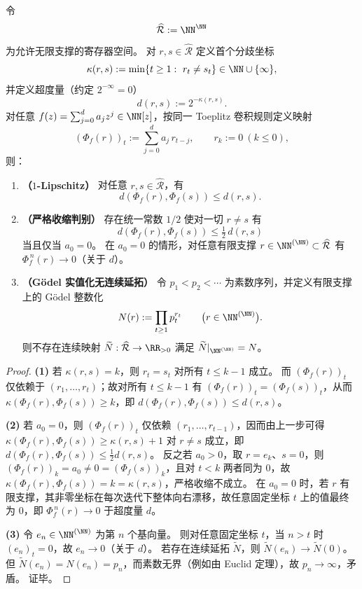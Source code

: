 \begin{theorem}\label{thm:conclusion-register-ultrametric-lipschitz-and-godel-no-real-extension}
令
\[
\widehat{\mathcal R}:=\NN^{\NN}
\]
为允许无限支撑的寄存器空间。
对 \(r,s\in\widehat{\mathcal R}\) 定义首个分歧坐标
\[
\kappa(r,s):=\min\{t\ge 1:\ r_t\neq s_t\}\in\NN\cup\{\infty\},
\]
并定义超度量（约定 \(2^{-\infty}=0\)）
\[
d(r,s):=2^{-\kappa(r,s)}.
\]
对任意 \(f(z)=\sum_{j=0}^{d}a_j z^j\in\NN[z]\)，按同一 Toeplitz 卷积规则定义映射
\[
(\Phi_f(r))_t:=\sum_{j=0}^{d}a_j\,r_{t-j},
\qquad r_k:=0\ (k\le 0),
\]
则：
\begin{enumerate}
  \item \textbf{（\(1\)-Lipschitz）}
        对任意 \(r,s\in\widehat{\mathcal R}\)，有
        \[
        d(\Phi_f(r),\Phi_f(s))\le d(r,s).
        \]
  \item \textbf{（严格收缩判别）}
        存在统一常数 \(1/2\) 使对一切 \(r\neq s\) 有
        \[
        d(\Phi_f(r),\Phi_f(s))\le \tfrac12\,d(r,s)
        \]
        当且仅当 \(a_0=0\)。
        在 \(a_0=0\) 的情形，对任意有限支撑 \(r\in\NN^{(\NN)}\subset\widehat{\mathcal R}\) 有 \(\Phi_f^{\,n}(r)\to 0\)（关于 \(d\)）。
  \item \textbf{（Gödel 实值化无连续延拓）}
        令 \(p_1<p_2<\cdots\) 为素数序列，并定义有限支撑上的 Gödel 整数化
        \[
        N(r):=\prod_{t\ge 1}p_t^{r_t}\qquad\bigl(r\in\NN^{(\NN)}\bigr).
        \]
        则不存在连续映射 \(\widetilde N:\widehat{\mathcal R}\to\RR_{>0}\) 满足 \(\widetilde N|_{\NN^{(\NN)}}=N\)。
\end{enumerate}
\end{theorem}
\begin{proof}
\textbf{(1)} 若 \(\kappa(r,s)=k\)，则 \(r_t=s_t\) 对所有 \(t\le k-1\) 成立。
而 \((\Phi_f(r))_t\) 仅依赖于 \((r_1,\dots,r_t)\)；故对所有 \(t\le k-1\) 有 \((\Phi_f(r))_t=(\Phi_f(s))_t\)，从而 \(\kappa(\Phi_f(r),\Phi_f(s))\ge k\)，即 \(d(\Phi_f(r),\Phi_f(s))\le d(r,s)\)。
\par
\textbf{(2)} 若 \(a_0=0\)，则 \((\Phi_f(r))_t\) 仅依赖 \((r_1,\dots,r_{t-1})\)，因而由上一步可得
\(\kappa(\Phi_f(r),\Phi_f(s))\ge \kappa(r,s)+1\)
对 \(r\neq s\) 成立，即
\(
d(\Phi_f(r),\Phi_f(s))\le \tfrac12 d(r,s)
\)。
反之若 \(a_0>0\)，取 \(r=e_k\)、\(s=0\)，则 \((\Phi_f(r))_k=a_0\neq 0=(\Phi_f(s))_k\)，且对 \(t<k\) 两者同为 \(0\)，故 \(\kappa(\Phi_f(r),\Phi_f(s))=k=\kappa(r,s)\)，严格收缩不成立。
在 \(a_0=0\) 时，若 \(r\) 有限支撑，其非零坐标在每次迭代下整体向右漂移，故任意固定坐标 \(t\) 上的值最终为 \(0\)，即 \(\Phi_f^{\,n}(r)\to 0\) 于超度量 \(d\)。
\par
\textbf{(3)} 令 \(e_n\in\NN^{(\NN)}\) 为第 \(n\) 个基向量。
则对任意固定坐标 \(t\)，当 \(n>t\) 时 \((e_n)_t=0\)，故 \(e_n\to 0\)（关于 \(d\)）。
若存在连续延拓 \(\widetilde N\)，则 \(\widetilde N(e_n)\to \widetilde N(0)\)。
但 \(\widetilde N(e_n)=N(e_n)=p_n\)，而素数无界（例如由 Euclid 定理），故 \(p_n\to\infty\)，矛盾。
证毕。
\end{proof}

\endinput
